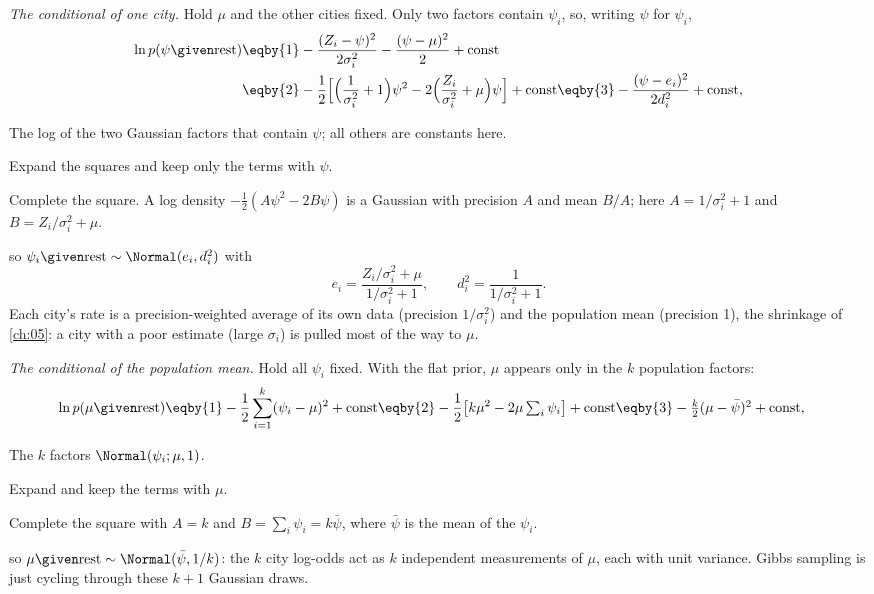 \emph{The conditional of one city.} Hold $\mu$ and the other cities fixed. Only two factors
contain $\psi_i$, so, writing $\psi$ for $\psi_i$,
\begin{align*}
  \ln p(\psi\given\text{rest})
  &\eqby{1}-\frac{(Z_i-\psi)^2}{2\sigma_i^2}-\frac{(\psi-\mu)^2}{2}+\text{const}
  \\
  &\eqby{2}-\frac12\Bigl[\Bigl(\frac1{\sigma_i^2}+1\Bigr)\psi^2
     -2\Bigl(\frac{Z_i}{\sigma_i^2}+\mu\Bigr)\psi\Bigr]+\text{const}
   \eqby{3}-\frac{(\psi-e_i)^2}{2d_i^2}+\text{const},
\end{align*}
\begin{explain}
  \item The log of the two Gaussian factors that contain $\psi$; all others are constants here.
  \item Expand the squares and keep only the terms with $\psi$.
  \item Complete the square. A log density $-\tfrac12(A\psi^2-2B\psi)$ is a Gaussian with
        precision $A$ and mean $B/A$; here $A=1/\sigma_i^2+1$ and $B=Z_i/\sigma_i^2+\mu$.
\end{explain}
so $\psi_i\given\text{rest}\sim\Normal(e_i,d_i^2)$ with
\begin{equation*}
  e_i=\frac{Z_i/\sigma_i^2+\mu}{1/\sigma_i^2+1},\qquad d_i^2=\frac{1}{1/\sigma_i^2+1}.
\end{equation*}
Each city's rate is a precision-weighted average of its own data (precision $1/\sigma_i^2$) and
the population mean (precision 1), the shrinkage of \cref{ch:05}: a city with a poor estimate
(large $\sigma_i$) is pulled most of the way to $\mu$.

\emph{The conditional of the population mean.} Hold all $\psi_i$ fixed. With the flat prior, $\mu$
appears only in the $k$ population factors:
\begin{align*}
  \ln p(\mu\given\text{rest})
  &\eqby{1}-\frac12\sum_{i=1}^k(\psi_i-\mu)^2+\text{const}
   \eqby{2}-\frac12\bigl[k\mu^2-2\mu\textstyle\sum_i\psi_i\bigr]+\text{const}
   \eqby{3}-\frac{k}{2}(\mu-\bar\psi)^2+\text{const},
\end{align*}
\begin{explain}
  \item The $k$ factors $\Normal(\psi_i;\mu,1)$.
  \item Expand and keep the terms with $\mu$.
  \item Complete the square with $A=k$ and $B=\sum_i\psi_i=k\bar\psi$, where $\bar\psi$ is the mean
        of the $\psi_i$.
\end{explain}
so $\mu\given\text{rest}\sim\Normal(\bar\psi,1/k)$: the $k$ city log-odds act as $k$ independent
measurements of $\mu$, each with unit variance. Gibbs sampling is just cycling through these
$k+1$ Gaussian draws.

